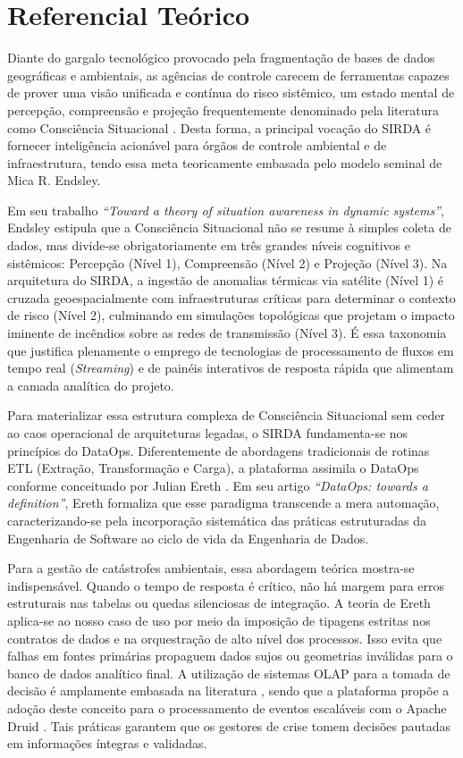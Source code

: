 \section{Referencial Teórico}

Diante do gargalo tecnológico provocado pela fragmentação de bases de dados geográficas e ambientais, as agências de controle carecem de ferramentas capazes de prover uma visão unificada e contínua do risco sistêmico, um estado mental de percepção, compreensão e projeção frequentemente denominado pela literatura como Consciência Situacional \cite{endsley1995}. Desta forma, a principal vocação do SIRDA é fornecer inteligência acionável para órgãos de controle ambiental e de infraestrutura, tendo essa meta teoricamente embasada pelo modelo seminal de Mica R. Endsley.

Em seu trabalho \textit{``Toward a theory of situation awareness in dynamic systems''}, Endsley estipula que a Consciência Situacional não se resume à simples coleta de dados, mas divide-se obrigatoriamente em três grandes níveis cognitivos e sistêmicos: Percepção (Nível 1), Compreensão (Nível 2) e Projeção (Nível 3). Na arquitetura do SIRDA, a ingestão de anomalias térmicas via satélite (Nível 1) é cruzada geoespacialmente com infraestruturas críticas para determinar o contexto de risco (Nível 2), culminando em simulações topológicas que projetam o impacto iminente de incêndios sobre as redes de transmissão (Nível 3). É essa taxonomia que justifica plenamente o emprego de tecnologias de processamento de fluxos em tempo real (\textit{Streaming}) e de painéis interativos de resposta rápida que alimentam a camada analítica do projeto.

Para materializar essa estrutura complexa de Consciência Situacional sem ceder ao caos operacional de arquiteturas legadas, o SIRDA fundamenta-se nos princípios do DataOps. Diferentemente de abordagens tradicionais de rotinas ETL (Extração, Transformação e Carga), a plataforma assimila o DataOps conforme conceituado por Julian Ereth \cite{ereth_dataops_2018}. Em seu artigo \textit{``DataOps: towards a definition''}, Ereth formaliza que esse paradigma transcende a mera automação, caracterizando-se pela incorporação sistemática das práticas estruturadas da Engenharia de Software ao ciclo de vida da Engenharia de Dados. 

Para a gestão de catástrofes ambientais, essa abordagem teórica mostra-se indispensável. Quando o tempo de resposta é crítico, não há margem para erros estruturais nas tabelas ou quedas silenciosas de integração. A teoria de Ereth aplica-se ao nosso caso de uso por meio da imposição de tipagens estritas nos contratos de dados e na orquestração de alto nível dos processos. Isso evita que falhas em fontes primárias propaguem dados sujos ou geometrias inválidas para o banco de dados analítico final. A utilização de sistemas OLAP para a tomada de decisão é amplamente embasada na literatura \cite{chaudhuri_olap_1997}, sendo que a plataforma propõe a adoção deste conceito para o processamento de eventos escaláveis com o Apache Druid \cite{yang_druid_2014}. Tais práticas garantem que os gestores de crise tomem decisões pautadas em informações íntegras e validadas.
